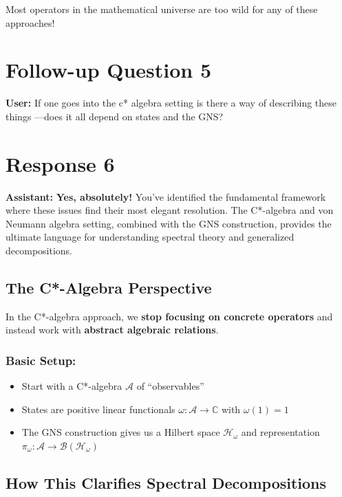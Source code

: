 \documentclass[aps,prl,reprint]{revtex4-2}
\begin{document}
Most operators in the mathematical universe are too wild for any of these
approaches!

\section*{Follow-up Question 5}

\textbf{User:} If one goes into the c* algebra setting is there a way of
describing these things ---does it all depend on states and the GNS?

\section*{Response 6}

\textbf{Assistant:} \textbf{Yes, absolutely!} You've identified the
fundamental framework where these issues find their most elegant resolution.
The C*-algebra and von Neumann algebra setting, combined with the GNS
construction, provides the ultimate language for understanding spectral
theory and generalized decompositions.

\subsection*{The C*-Algebra Perspective}

In the C*-algebra approach, we \textbf{stop focusing on concrete operators}
and instead work with \textbf{abstract algebraic relations}.

\subsubsection*{Basic Setup:}

\begin{itemize}
\item Start with a C*-algebra $\mathcal{A}$ of ``observables''

\item States are positive linear functionals $\omega: \mathcal{A} \to 
\mathbb{C}$ with $\omega(1) = 1$

\item The GNS construction gives us a Hilbert space $\mathcal{H}_\omega$ and
representation $\pi_\omega: \mathcal{A} \to \mathcal{B}(\mathcal{H}_\omega)$
\end{itemize}

\subsection*{How This Clarifies Spectral Decompositions}
\end{document}
